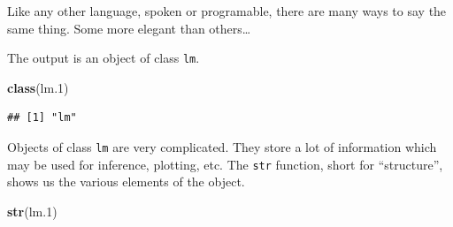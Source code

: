 \documentclass[]{book}
\newenvironment{Shaded}{\begin{snugshade}}{\end{snugshade}}
\newcommand{\KeywordTok}[1]{\textcolor[rgb]{0.13,0.29,0.53}{\textbf{#1}}}
\newcommand{\DataTypeTok}[1]{\textcolor[rgb]{0.13,0.29,0.53}{#1}}
\newcommand{\DecValTok}[1]{\textcolor[rgb]{0.00,0.00,0.81}{#1}}
\newcommand{\StringTok}[1]{\textcolor[rgb]{0.31,0.60,0.02}{#1}}
\newcommand{\OperatorTok}[1]{\textcolor[rgb]{0.81,0.36,0.00}{\textbf{#1}}}
\newcommand{\NormalTok}[1]{#1}
\theoremstyle{definition}
\theoremstyle{definition}
\theoremstyle{definition}
\theoremstyle{remark}
\begin{document}
Like any other language, spoken or programable, there are many ways to
say the same thing. Some more elegant than others\ldots{}

\begin{Shaded}
\end{Shaded}

The output is an object of class \texttt{lm}.

\begin{Shaded}
\begin{Highlighting}[]
\KeywordTok{class}\NormalTok{(lm.}\DecValTok{1}\NormalTok{)}
\end{Highlighting}
\end{Shaded}

\begin{verbatim}
## [1] "lm"
\end{verbatim}

Objects of class \texttt{lm} are very complicated. They store a lot of
information which may be used for inference, plotting, etc. The
\texttt{str} function, short for ``structure'', shows us the various
elements of the object.

\begin{Shaded}
\begin{Highlighting}[]
\KeywordTok{str}\NormalTok{(lm.}\DecValTok{1}\NormalTok{)}
\end{Highlighting}
\end{Shaded}
\end{document}

